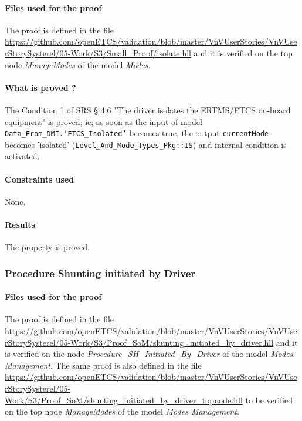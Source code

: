 \paragraph{Files used for the proof} The proof is defined in the file \url{https://github.com/openETCS/validation/blob/master/VnVUserStories/VnVUserStorySysterel/05-Work/S3/Small_Proof/isolate.hll} and it is verified on the top node \emph{ManageModes} of the \SCADE{} model \emph{Modes}.


\paragraph{What is proved ?}
The Condition 1 of SRS § 4.6 "The driver isolates the ERTMS/ETCS on-board equipment" is proved, ie; as soon as the input of \SCADE{} model \texttt{Data\_From\_DMI.'ETCS\_Isolated'} becomes true, the output \texttt{currentMode} becomes 'isolated' (\texttt{Level\_And\_Mode\_Types\_Pkg::IS}) and internal condition  is activated.


\paragraph{Constraints used}

None.

\paragraph{Results}

The property is proved.


\subsubsection{Procedure Shunting initiated by Driver}

\paragraph{Files used for the proof} The proof is defined in the file \url{https://github.com/openETCS/validation/blob/master/VnVUserStories/VnVUserStorySysterel/05-Work/S3/Proof_SoM/shunting_initiated_by_driver.hll} and it is verified on the node \emph{Procedure\_SH\_Initiated\_By\_Driver} of the \SCADE{} model \emph{Modes Management}. The same proof is also defined in the file \url{https://github.com/openETCS/validation/blob/master/VnVUserStories/VnVUserStorySysterel/05-Work/S3/Proof_SoM/shunting_initiated_by_driver_topnode.hll} to be verified on the top node \emph{ManageModes} of the \SCADE{} model \emph{Modes Management}.

